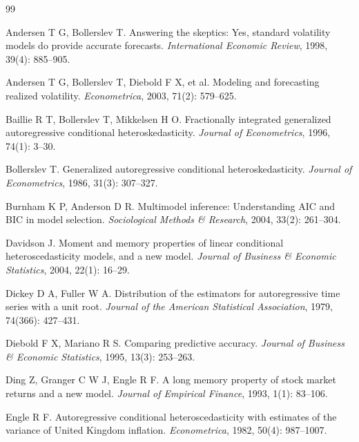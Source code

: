 \documentclass[12pt,a4paper]{article}
\begin{document}
\begin{thebibliography}{99}

Andersen T G, Bollerslev T.
\newblock Answering the skeptics: Yes, standard volatility models do provide accurate forecasts.
\newblock \textit{International Economic Review}, 1998, 39(4): 885--905.

Andersen T G, Bollerslev T, Diebold F X, et al.
\newblock Modeling and forecasting realized volatility.
\newblock \textit{Econometrica}, 2003, 71(2): 579--625.

Baillie R T, Bollerslev T, Mikkelsen H O.
\newblock Fractionally integrated generalized autoregressive conditional heteroskedasticity.
\newblock \textit{Journal of Econometrics}, 1996, 74(1): 3--30.

Bollerslev T.
\newblock Generalized autoregressive conditional heteroskedasticity.
\newblock \textit{Journal of Econometrics}, 1986, 31(3): 307--327.

Burnham K P, Anderson D R.
\newblock Multimodel inference: Understanding AIC and BIC in model selection.
\newblock \textit{Sociological Methods \& Research}, 2004, 33(2): 261--304.

Davidson J.
\newblock Moment and memory properties of linear conditional heteroscedasticity models, and a new model.
\newblock \textit{Journal of Business \& Economic Statistics}, 2004, 22(1): 16--29.

Dickey D A, Fuller W A.
\newblock Distribution of the estimators for autoregressive time series with a unit root.
\newblock \textit{Journal of the American Statistical Association}, 1979, 74(366): 427--431.

Diebold F X, Mariano R S.
\newblock Comparing predictive accuracy.
\newblock \textit{Journal of Business \& Economic Statistics}, 1995, 13(3): 253--263.

Ding Z, Granger C W J, Engle R F.
\newblock A long memory property of stock market returns and a new model.
\newblock \textit{Journal of Empirical Finance}, 1993, 1(1): 83--106.

Engle R F.
\newblock Autoregressive conditional heteroscedasticity with estimates of the variance of United Kingdom inflation.
\newblock \textit{Econometrica}, 1982, 50(4): 987--1007.


\end{thebibliography}
\end{document}
